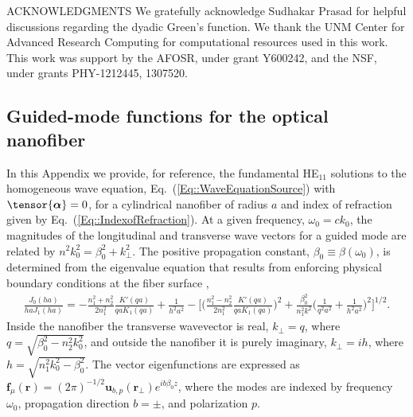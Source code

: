 \documentclass[preprint, aps,pra,onecolumn]{revtex4-1} %
\def\br{\mathbf{r}}
\newcommand{\erf}[1]{Eq.~(\ref{#1})}
\newcommand{\mbf}[1]{\mathbf{#1}}
\begin{document}
ACKNOWLEDGMENTS 
We gratefully acknowledge Sudhakar Prasad for helpful discussions regarding the dyadic Green's function. 
We thank the UNM Center for Advanced Research Computing for computational resources used in this work. 
This work was support by the AFOSR, under grant Y600242, and the NSF, under grants PHY-1212445, 1307520. 



\begin{appendix}	


\section{Guided-mode functions for the optical nanofiber} \label{Appendix::ModeFunctions}

  

In this Appendix we provide, for reference, the fundamental HE$_{11}$ solutions to the homogeneous wave equation, \erf{Eq::WaveEquationSource} with $\tensor{\boldsymbol{\alpha}} = 0$, for a cylindrical nanofiber of radius $a$ and index of refraction given by \erf{Eq::IndexofRefraction}.  At a given frequency, $\omega_0 = c k_0$, the magnitudes of the longitudinal and transverse wave vectors for a guided mode are related by $n^2 k_0^2 = \beta_0^2 + k_\perp^2$.  
The positive propagation constant, $\beta_0 \equiv \beta(\omega_0)$, is determined from the eigenvalue equation that results from enforcing physical boundary conditions at the fiber surface \cite{snyder_optical_1983},
	\begin{align}
		\frac{J_0(ha)}{ha J_1(ha)} = - \frac{n_1^2+n_2^2}{2n_1^2} \frac{K'(qa)}{qa K_1(qa)} + \frac{1}{h^2 a^2} - \bigg[ \bigg(\frac{n_1^2 - n_2^2}{2 n_1^2} \frac{K'(qa)}{qa K_1(qa)} \bigg)^2  + \frac{\beta_0^2}{n^2_1 k^2} \bigg(\frac{1}{q^2a^2} + \frac{1}{h^2a^2} \bigg)^2 \bigg]^{1/2}.
	\end{align}
Inside the nanofiber the transverse wavevector is real, $k_\perp = q$, where $q=\sqrt{\beta_0^2- n_2^2k_0^2}$, and outside the nanofiber it is purely imaginary, $k_\perp = i h$, where $h=\sqrt{n_1^2 k_0^2 - \beta_0^2}$.  The vector eigenfunctions are expressed as $\mbf{f}_{\mu}(\br) = (2\pi)^{-1/2}\mbf{u}_{b,p}(\mbf{r}_\perp) e^{i b \beta_0 z}$, where the modes are indexed by frequency $\omega_0$, propagation direction $b = \pm$, and polarization $p$.


\end{appendix}
\end{document}
